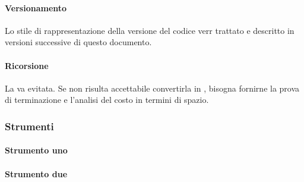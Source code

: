  \paragraph{Versionamento}
 Lo stile di rappresentazione della versione del codice verr trattato e descritto in versioni successive di questo documento.
 \paragraph{Ricorsione}
 La  va evitata. Se non risulta accettabile convertirla in , bisogna fornirne la prova di terminazione e l'analisi del costo in termini di spazio.
\subsubsection{Strumenti}
  \paragraph{Strumento uno}

 \paragraph{Strumento due}



  
